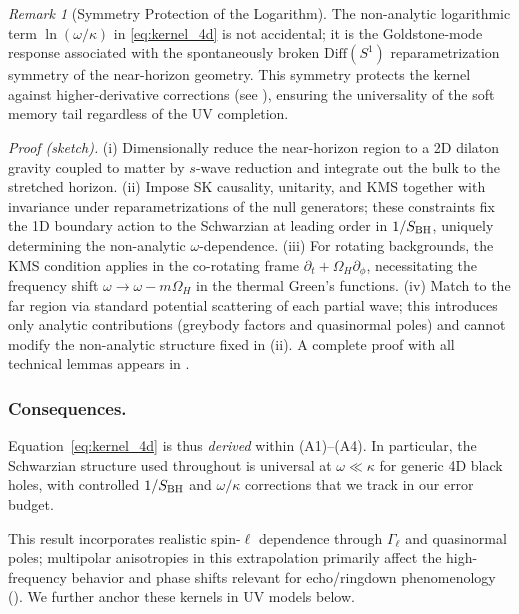 \documentclass[aps,prd,preprint,onecolumn,superscriptaddress,nofootinbib,longbibliography,floatfix,11pt,showpacs,showkeys]{revtex4-2}
\theoremstyle{plain}
\theoremstyle{definition}
\theoremstyle{remark}
\newtheorem{remark}[theorem]{Remark}
\begin{document}
\begin{remark}[Symmetry Protection of the Logarithm]\label{rem:symmetry-protection}
The non-analytic logarithmic term $\ln(\omega/\kappa)$ in \eqref{eq:kernel_4d} is not accidental; it is the Goldstone-mode response associated with the spontaneously broken $\mathrm{Diff}(S^1)$ reparametrization symmetry of the near-horizon geometry. This symmetry protects the kernel against higher-derivative corrections (see ), ensuring the universality of the soft memory tail regardless of the UV completion.
\end{remark}

\noindent\emph{Proof (sketch).} (i) Dimensionally reduce the near-horizon region to a 2D dilaton gravity coupled to matter by $s$-wave reduction and integrate out the bulk to the stretched horizon. (ii) Impose SK causality, unitarity, and KMS together with invariance under reparametrizations of the null generators; these constraints fix the 1D boundary action to the Schwarzian at leading order in $1/S_{\rm BH}$, uniquely determining the non-analytic $\omega$-dependence. (iii) For rotating backgrounds, the KMS condition applies in the co-rotating frame $\partial_t + \Omega_H \partial_\phi$, necessitating the frequency shift $\omega \to \omega - m\Omega_H$ in the thermal Green's functions. (iv) Match to the far region via standard potential scattering of each partial wave; this introduces only analytic contributions (greybody factors and quasinormal poles) and cannot modify the non-analytic structure fixed in (ii). A complete proof with all technical lemmas appears in .
 
\subsubsection{Consequences.}
Equation~\eqref{eq:kernel_4d} is thus \emph{derived} within (A1)--(A4). In particular, the Schwarzian structure used throughout is universal at $\omega\ll\kappa$ for generic 4D black holes, with controlled $1/S_{\rm BH}$ and $\omega/\kappa$ corrections that we track in our error budget.

This result incorporates realistic spin-$\ell$ dependence through $\Gamma_\ell$ and quasinormal poles; multipolar anisotropies in this extrapolation primarily affect the high-frequency behavior and phase shifts relevant for echo/ringdown phenomenology (). We further anchor these kernels in UV models below.
\end{document}
